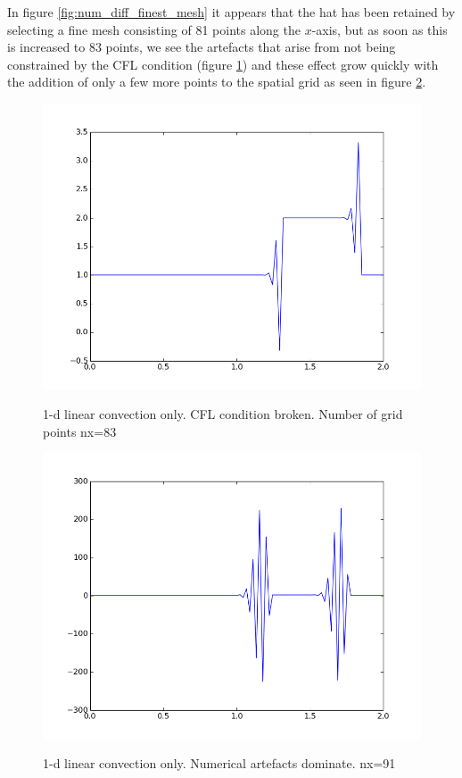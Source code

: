 \documentclass[11pt]{article}
\begin{document}
{In figure \ref{fig:num_diff_finest_mesh} it appears that the hat has been retained by selecting
a fine mesh consisting of 81 points along the $x$-axis, but as soon as this is increased to
83 points, we see the artefacts that arise from not being constrained by the CFL condition
(figure \ref{fig:num_diff_too_fine}) and these effect grow quickly with the addition of only
a few more points to the spatial grid as seen in figure \ref{fig:num_diff_too_fine_explode}.

	\begin{figure}[H]
	\centering
	\caption{1-d linear convection only. CFL condition broken. Number of grid points nx=83}
	\includegraphics[scale=0.6]{cfl_broke.png}
	\label{fig:num_diff_too_fine}
	\end{figure}

	\begin{figure}[H]
	\centering
	\caption{1-d linear convection only. Numerical artefacts dominate. nx=91}
	\includegraphics[scale=0.6]{cfl_explode.png}
	\label{fig:num_diff_too_fine_explode}
	\end{figure}

}
\end{document}
